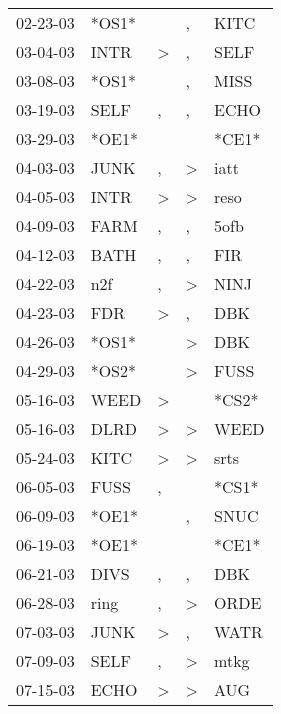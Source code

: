 \begin{supertabular}{lllll}
 02-23-03 &  *OS1* &                  &                , &   KITC \\
 03-04-03 &   INTR &     \textgreater &                , &   SELF \\
 03-08-03 &  *OS1* &                  &                , &   MISS \\
 03-19-03 &   SELF &                , &                , &   ECHO \\
 03-29-03 &  *OE1* &                  &                  &  *CE1* \\
 04-03-03 &   JUNK &                , &     \textgreater &   iatt \\
 04-05-03 &   INTR &     \textgreater &     \textgreater &   reso \\
 04-09-03 &   FARM &                , &                , &   5ofb \\
 04-12-03 &   BATH &                , &                , &    FIR \\
 04-22-03 &    n2f &                , &     \textgreater &   NINJ \\
 04-23-03 &    FDR &     \textgreater &                , &    DBK \\
 04-26-03 &  *OS1* &                  &     \textgreater &    DBK \\
 04-29-03 &  *OS2* &                  &     \textgreater &   FUSS \\
 05-16-03 &   WEED &     \textgreater &                  &  *CS2* \\
 05-16-03 &   DLRD &     \textgreater &     \textgreater &   WEED \\
 05-24-03 &   KITC &     \textgreater &     \textgreater &   srts \\
 06-05-03 &   FUSS &                , &                  &  *CS1* \\
 06-09-03 &  *OE1* &                  &                , &   SNUC \\
 06-19-03 &  *OE1* &                  &                  &  *CE1* \\
 06-21-03 &   DIVS &                , &                , &    DBK \\
 06-28-03 &   ring &                , &     \textgreater &   ORDE \\
 07-03-03 &   JUNK &     \textgreater &                , &   WATR \\
 07-09-03 &   SELF &                , &     \textgreater &   mtkg \\
 07-15-03 &   ECHO &     \textgreater &     \textgreater &    AUG \\

\end{supertabular}
